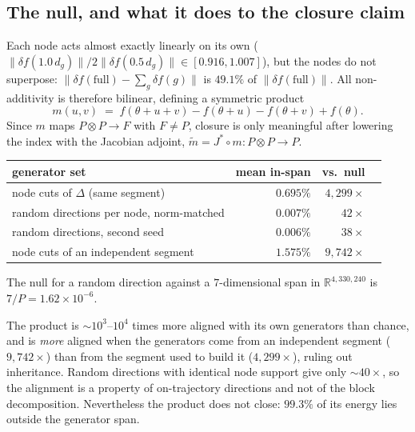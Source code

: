 \subsection{The null, and what it does to the closure claim}

Each node acts almost exactly linearly on its own
($\|\delta f(1.0\,d_g)\| / 2\|\delta f(0.5\,d_g)\| \in [0.916, 1.007]$), but the
nodes do not superpose: $\|\delta f(\text{full}) - \sum_g \delta f(g)\|$ is
$49.1\%$ of $\|\delta f(\text{full})\|$. All non-additivity is therefore
bilinear, defining a symmetric product
\begin{equation}
  m(u,v) \;=\; f(\theta+u+v) - f(\theta+u) - f(\theta+v) + f(\theta).
\end{equation}
Since $m$ maps $P\otimes P \to F$ with $F \neq P$, closure is only meaningful
after lowering the index with the Jacobian adjoint,
$\tilde m = J^{*}\!\circ m : P\otimes P \to P$.

\begin{center}
\begin{tabular}{lrrr}
\toprule
generator set & mean in-span & vs.\ null & \\
\midrule
node cuts of $\Delta$ (same segment)      & $0.695\%$ & $4{,}299\times$ \\
random directions per node, norm-matched  & $0.007\%$ & $42\times$ \\
random directions, second seed            & $0.006\%$ & $38\times$ \\
node cuts of an independent segment       & $1.575\%$ & $9{,}742\times$ \\
\bottomrule
\end{tabular}
\end{center}

The null for a random direction against a $7$-dimensional span in
$\mathbb{R}^{4{,}330{,}240}$ is $7/P = 1.62\times10^{-6}$.

\begin{observation}
The product is $\sim\!10^3$--$10^4$ times more aligned with its own generators
than chance, and is \emph{more} aligned when the generators come from an
independent segment ($9{,}742\times$) than from the segment used to build it
($4{,}299\times$), ruling out inheritance. Random directions with identical
node support give only $\sim\!40\times$, so the alignment is a property of
on-trajectory directions and not of the block decomposition. Nevertheless the
product does not close: $99.3\%$ of its energy lies outside the generator span.
\end{observation}

